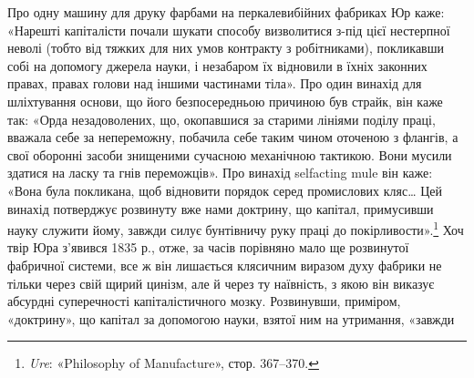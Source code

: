 Про одну машину для друку фарбами на перкалевибійних
фабриках Юр каже: «Нарешті капіталісти почали шукати способу
визволитися з-під цієї нестерпної неволі (тобто від тяжких
для них умов контракту з робітниками), покликавши собі на допомогу
джерела науки, і незабаром їх відновили в їхніх законних
правах, правах голови над іншими частинами тіла». Про один
винахід для шліхтування основи, що його безпосередньою причиною
був страйк, він каже так: «Орда незадоволених, що, окопавшися
за старими лініями поділу праці, вважала себе за непереможну,
побачила себе таким чином оточеною з флангів, а свої
оборонні засоби знищеними сучасною механічною тактикою. Вони
мусили здатися на ласку та гнів переможців». Про винахід
selfacting mule він каже: «Вона була покликана, щоб відновити
порядок серед промислових кляс\dots{} Цей винахід потверджує
розвинуту вже нами доктрину, що капітал, примусивши науку
служити йому, завжди силує бунтівничу руку праці до покірливости».\footnote{
\emph{Ure}: «Philosophy of Manufacture», стор. 367--370.
} Хоч твір Юра з’явився 1835 р., отже, за часів порівняно
мало ще розвинутої фабричної системи, все ж він лишається клясичним
виразом духу фабрики не тільки через свій щирий цинізм,
але й через ту наївність, з якою він виказує абсурдні суперечності
капіталістичного мозку. Розвинувши, приміром, «доктрину»,
що капітал за допомогою науки, взятої ним на утримання, «завжди
\parbreak{}  %
